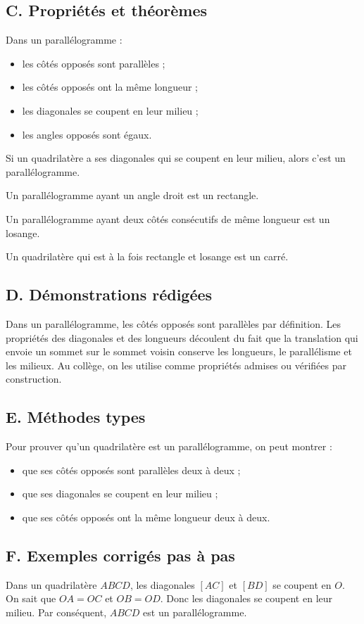 \documentclass[11pt,a4paper]{article}
\newcommand{\props}{\subsection*{C. Propriétés et théorèmes}}
\newcommand{\demos}{\subsection*{D. Démonstrations rédigées}}
\newcommand{\methodes}{\subsection*{E. Méthodes types}}
\newcommand{\exemples}{\subsection*{F. Exemples corrigés pas à pas}}
\begin{document}
\props
\begin{proprietebox}
Dans un parallélogramme :
\begin{itemize}
\item les côtés opposés sont parallèles ;
\item les côtés opposés ont la même longueur ;
\item les diagonales se coupent en leur milieu ;
\item les angles opposés sont égaux.
\end{itemize}
\end{proprietebox}

\begin{proprietebox}
Si un quadrilatère a ses diagonales qui se coupent en leur milieu, alors c'est un parallélogramme.
\end{proprietebox}

\begin{proprietebox}
Un parallélogramme ayant un angle droit est un rectangle.

Un parallélogramme ayant deux côtés consécutifs de même longueur est un losange.

Un quadrilatère qui est à la fois rectangle et losange est un carré.
\end{proprietebox}

\demos
\begin{preuvebox}
Dans un parallélogramme, les côtés opposés sont parallèles par définition. Les propriétés des diagonales et des longueurs découlent du fait que la translation qui envoie un sommet sur le sommet voisin conserve les longueurs, le parallélisme et les milieux. Au collège, on les utilise comme propriétés admises ou vérifiées par construction.
\end{preuvebox}

\methodes
\begin{methodebox}
Pour prouver qu'un quadrilatère est un parallélogramme, on peut montrer :
\begin{itemize}
\item que ses côtés opposés sont parallèles deux à deux ;
\item que ses diagonales se coupent en leur milieu ;
\item que ses côtés opposés ont la même longueur deux à deux.
\end{itemize}
\end{methodebox}

\exemples
\begin{exemplebox}
Dans un quadrilatère $ABCD$, les diagonales $[AC]$ et $[BD]$ se coupent en $O$. On sait que $OA=OC$ et $OB=OD$. Donc les diagonales se coupent en leur milieu. Par conséquent, $ABCD$ est un parallélogramme.
\end{exemplebox}
\end{document}
